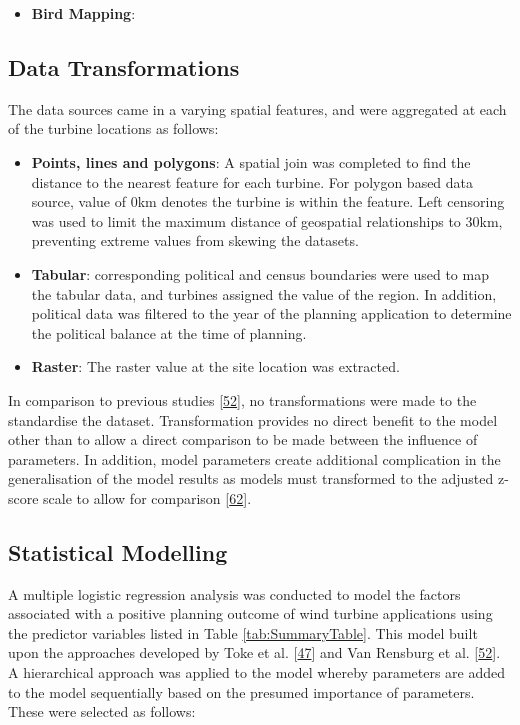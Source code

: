 \documentclass[a4paper,]{article}
\providecommand{\tightlist}{%
  \setlength{\itemsep}{0pt}\setlength{\parskip}{0pt}}
\theoremstyle{definition}
\theoremstyle{definition}
\theoremstyle{definition}
\theoremstyle{remark}
\begin{document}
\begin{itemize}
\tightlist
\item
  \textbf{Bird Mapping}:
\end{itemize}

\subsection{Data Transformations}\label{data-transformations}

The data sources came in a varying spatial features, and were aggregated
at each of the turbine locations as follows:

\begin{itemize}
\tightlist
\item
  \textbf{Points, lines and polygons}: A spatial join was completed to
  find the distance to the nearest feature for each turbine. For polygon
  based data source, value of 0km denotes the turbine is within the
  feature. Left censoring was used to limit the maximum distance of
  geospatial relationships to 30km, preventing extreme values from
  skewing the datasets.
\item
  \textbf{Tabular}: corresponding political and census boundaries were
  used to map the tabular data, and turbines assigned the value of the
  region. In addition, political data was filtered to the year of the
  planning application to determine the political balance at the time of
  planning.
\item
  \textbf{Raster}: The raster value at the site location was extracted.
\end{itemize}

In comparison to previous studies
{[}\protect\hyperlink{ref-VanRensburg20}{52}{]}, no transformations were
made to the standardise the dataset. Transformation provides no direct
benefit to the model other than to allow a direct comparison to be made
between the influence of parameters. In addition, model parameters
create additional complication in the generalisation of the model
results as models must transformed to the adjusted z-score scale to
allow for comparison {[}\protect\hyperlink{ref-Harrell2001}{62}{]}.

\subsection{Statistical Modelling}\label{statistical-modelling}

A multiple logistic regression analysis was conducted to model the
factors associated with a positive planning outcome of wind turbine
applications using the predictor variables listed in Table
\ref{tab:SummaryTable}. This model built upon the approaches developed
by Toke et al. {[}\protect\hyperlink{ref-Toke2005}{47}{]} and Van
Rensburg et al. {[}\protect\hyperlink{ref-VanRensburg20}{52}{]}. A
hierarchical approach was applied to the model whereby parameters are
added to the model sequentially based on the presumed importance of
parameters. These were selected as follows:
\end{document}
